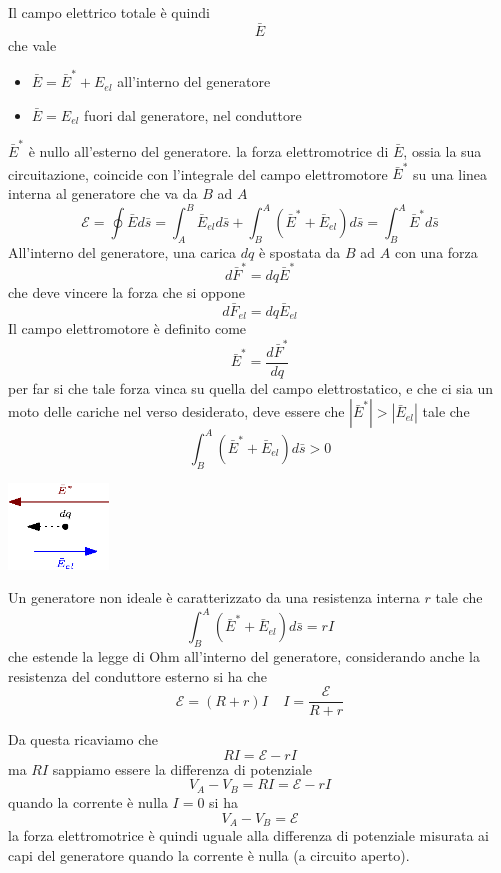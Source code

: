 \documentclass[10pt, letterpaper]{report}
\begin{document}
Il campo elettrico totale è quindi $$ \bar E$$ che vale \begin{itemize}
    \item $\bar E= \bar E^*+E_{el}$ all'interno del generatore 
    \item $\bar E= E_{el}$ fuori dal generatore, nel conduttore
\end{itemize}
$\bar E^*$ è nullo all'esterno del generatore. la forza elettromotrice di  $\bar E$, ossia la sua circuitazione, coincide con l'integrale del campo elettromotore $\bar E^*$ su una linea interna al generatore che va da $B$ ad $A$ 
$$ \mathscr{E} = \oint \bar E d\bar s = \int_A^B \bar E_{el}d\bar s + \int_B^A (\bar E^*+\bar E_{el})d\bar s = \int_B^A \bar E^*d\bar s $$
All'interno del generatore, una carica $dq$ è spostata da $B$ ad $A$ con una forza $$ d\bar F^*=dq\bar E^*$$ che deve vincere la forza che si oppone $$ d\bar F_{el}=dq\bar E_{el}$$ Il campo elettromotore è definito come 
$$ \bar E^*=\frac{d\bar F^*}{dq}$$
per far si che tale forza vinca su quella del campo elettrostatico, e che ci sia un moto delle cariche nel verso desiderato, deve essere che $|\bar E ^*|>|\bar E_{el}|$ tale che 
$$ \int_B^A (\bar E^*+\bar E_{el})d\bar s >0$$
\begin{center}
    \includegraphics[width=0.2\textwidth]{images/forzaVince.eps}
\end{center}
Un generatore non ideale è caratterizzato da una resistenza interna $r$ tale che 
$$ \int_B^A (\bar E^*+\bar E_{el})d\bar s =rI$$
che estende la legge di Ohm all'interno del generatore, considerando anche la resistenza del conduttore esterno si ha  che $$\mathscr{E} = (R+r)I\ \ \ \ \ I=\frac{\mathscr{E}}{R+r}$$

Da questa ricaviamo che $$ RI=\mathscr{E}-rI$$
ma $RI$ sappiamo essere la differenza di potenziale 
 $$ V_A-V_B=RI=\mathscr{E}-rI$$
 quando la corrente è nulla $I=0$ si ha 
 $$ V_A-V_B=\mathscr{E}$$
 la forza elettromotrice è quindi uguale alla differenza di potenziale misurata ai capi del generatore quando la corrente è nulla (a circuito aperto).\flowerLine 
\end{document}
